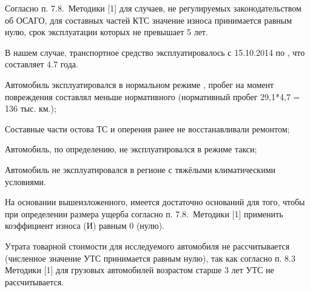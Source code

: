 %
%



\par Согласно п. 7.8.\, Методики [1]  для случаев, не регулируемых законодательством об ОСАГО, для составных частей КТС значение износа принимается равным нулю, срок эксплуатации которых не превышает 5 лет.

В нашем случае, транспортное средство эксплуатировалось с 15.10.2014  по , что составляет 4.7 года.

Автомобиль эксплуатировался в нормальном режиме , пробег на момент повреждения составлял меньше нормативного (нормативный пробег 29,1*4,7 = 136 тыс. км.);

Составные части остова ТС и оперения ранее не восстанавливали ремонтом;

Автомобиль, по определению, не эксплуатировался в режиме такси;

Автомобиль не эксплуатировался в регионе с тяжёлыми климатическими условиями.

На основании вышеизложенного, имеется достаточно оснований для того, чтобы  при определении размера ущерба согласно п. 7.8.\, Методики [1]  применить коэффициент износа (И) равным 0 (нулю).   
  
Утрата товарной стоимости для исследуемого автомобиля не рассчитывается (численное значение УТС принимается равным нулю), так как согласно п. 8.3  Методики [1]  для грузовых автомобилей возрастом старше 3 лет УТС не рассчитывается.
%
%



